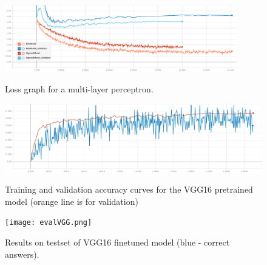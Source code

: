 \documentclass[a4paper]{article}
\begin{document}
\begin{figure}[h]
    \caption[]{Loss graph for a multi-layer perceptron.}
    \centering
    \includegraphics[page=2,width=0.9\textwidth]{training_loss.png}
    \label{fig:training_loss}
\end{figure}

\begin{figure}[H]
    \caption[]{Training and validation accuracy curves for the VGG16 pretrained model (orange line is for validation)}
    \centering
    \includegraphics[page=2,width=1.0\textwidth]{vggTraining_accuracy.png}
    \label{fig:trainingVGG_accuracy}
\end{figure}



\begin{figure}[h]
    \caption[]{Results on testset of VGG16 finetuned model (blue - correct answers).}
    \centering
    \texttt{[image: evalVGG.png]}
    \label{fig:evalVGG}
\end{figure}
\end{document}
